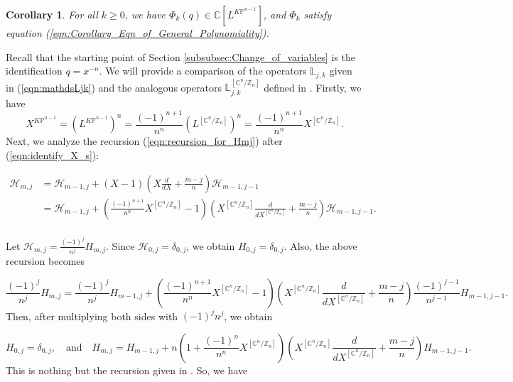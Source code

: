 \documentclass[12pt]{amsart}
\newtheorem{cor}[prop]{Corollary}
\numberwithin{equation}{section}
\newcommand{\CnZn}{[\mathbb{C}^n/\mathbb{Z}_n]}
\newcommand{\KP}{K\mathbb{P}}
\begin{document}
\begin{cor}\label{cor:polynomiality_of_Phi_k}
For all $k \geq 0$, we have $\Phi_{k}(q)\in\mathbb{C}\left[L^{\KP^{n-1}}\right]$, and $\Phi_{k}$ satisfy equation (\ref{eqn:Corollary_Eqn_of_General_Polynomiality}).
\end{cor}

Recall that the starting point of Section \ref{subsubsec:Change_of_variables} is the identification $q=x^{-n}$. We will provide a comparison of the operators $\mathds{L}_{j,k}$ given in (\ref{eqn:mathdsLjk}) and the analogous operators $\mathds{L}^{\CnZn}_{j,k}$ defined in \cite[Appendix B]{gt}. Firstly, we have
\begin{equation}\label{eqn:identify_X_s}
X^{\KP^{n-1}}=(L^{\KP^{n-1}})^n=\frac{(-1)^{n+1}}{n^n}(L^{\CnZn})^{n}= \frac{(-1)^{n+1}}{n^n}{X^{\CnZn}}.
\end{equation}
Next, we analyze the recursion (\ref{eqn:recursion_for_Hmj}) after (\ref{eqn:identify_X_s}):

\begin{equation*}
\begin{aligned}
\mathcal{H}_{m, j}
&=\mathcal{H}_{m-1, j}+(X-1)\left(X \frac{d}{d X}+\frac{m-j}{n}\right) \mathcal{H}_{m-1, j-1}\\
&=\mathcal{H}_{m-1, j}+(\frac{(-1)^{n+1}}{n^n}{X}^{\CnZn}-1)\left({X}^{\CnZn} \frac{d}{d {X}^{\CnZn}}+\frac{m-j}{n}\right) \mathcal{H}_{m-1, j-1}.\\
\end{aligned}
\end{equation*}

Let $\mathcal{H}_{m, j}=\frac{(-1)^j}{n^j}H_{m,j}$. Since $\mathcal{H}_{0, j}=\delta_{0,j}$, we obtain ${H}_{0, j}=\delta_{0,j}$. Also, the above recursion becomes

\begin{equation*}
\frac{(-1)^j}{n^j}{H}_{m, j}
=\frac{(-1)^j}{n^j}{H}_{m-1, j}+\left(\frac{(-1)^{n+1}}{n^n}{X}^{\CnZn}-1\right)\left({X}^{\CnZn} \frac{d}{d {X}^{\CnZn}}+\frac{m-j}{n}\right) \frac{(-1)^{j-1}}{n^{j-1}}{H}_{m-1, j-1}.
\end{equation*}
Then, after multiplying both sides with $(-1)^jn^j$, we obtain

\begin{equation*}
{H}_{0, j}=\delta_{0,j}, \quad \text{and} \quad{H}_{m, j}
={H}_{m-1, j}+n(1+\frac{(-1)^{n}}{n^n}{X}^{\CnZn})\left({X}^{\CnZn} \frac{d}{d {X}^{\CnZn}}+\frac{m-j}{n}\right) {H}_{m-1, j-1}.
\end{equation*}
This is nothing but the recursion given in \cite[Equation (B.7)]{gt}. So, we have
\end{document}
